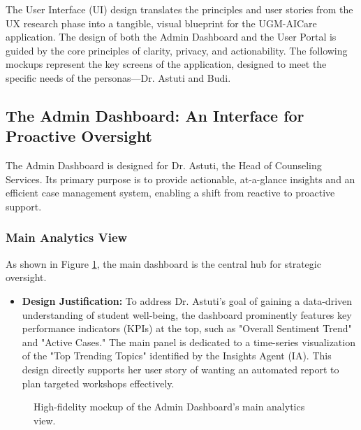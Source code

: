 The User Interface (UI) design translates the principles and user stories from the UX research phase into a tangible, visual blueprint for the UGM-AICare application. The design of both the Admin Dashboard and the User Portal is guided by the core principles of clarity, privacy, and actionability. The following mockups represent the key screens of the application, designed to meet the specific needs of the personas—Dr. Astuti and Budi.

\subsection{The Admin Dashboard: An Interface for Proactive Oversight}

The Admin Dashboard is designed for Dr. Astuti, the Head of Counseling Services. Its primary purpose is to provide actionable, at-a-glance insights and an efficient case management system, enabling a shift from reactive to proactive support.

\subsubsection{Main Analytics View}
As shown in Figure \ref{fig:ui_admin_dashboard}, the main dashboard is the central hub for strategic oversight.
\begin{itemize}
    \item \textbf{Design Justification:} To address Dr. Astuti's goal of gaining a data-driven understanding of student well-being, the dashboard prominently features key performance indicators (KPIs) at the top, such as "Overall Sentiment Trend" and "Active Cases." The main panel is dedicated to a time-series visualization of the "Top Trending Topics" identified by the Insights Agent (IA). This design directly supports her user story of wanting an automated report to plan targeted workshops effectively.
\end{itemize}

\begin{figure}[h]
    \centering
    \caption{High-fidelity mockup of the Admin Dashboard's main analytics view.}
    \label{fig:ui_admin_dashboard}
\end{figure}

